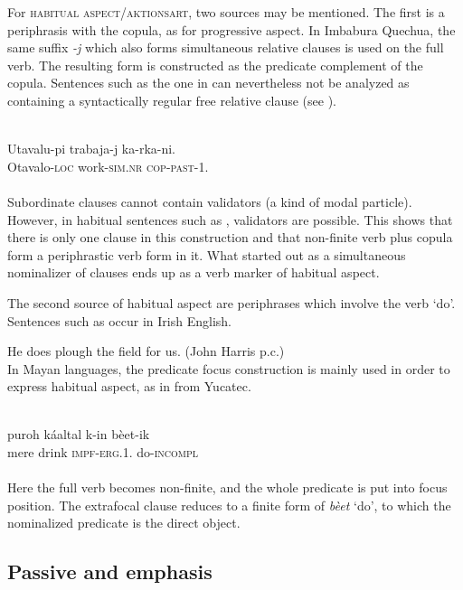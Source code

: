 \label{page33b}For \textsc{habitual aspect/aktionsart}, two sources may be mentioned. The first is a periphrasis with the copula, as for progressive aspect. In Imbabura Quechua, the same suffix \textit{{}-j} which also forms simultaneous relative clauses is used on the full verb. The resulting form is constructed as the predicate complement of the copula. Sentences such as the one in  can nevertheless not be analyzed as containing a syntactically regular free relative clause (see \citealt[149]{Cole1982}).

\ea\label{ex:E4}
\\
\gll Utavalu-pi  trabaja-j  ka-rka-ni.\\
Otavalo-\textsc{loc}  work-\textsc{sim}.\textsc{nr}  \textsc{cop}-\textsc{past}-1.\glsg\\
\\
\z
\noindent Subordinate clauses cannot contain validators (a kind of modal particle). However, in habitual sentences such as , validators are possible. This shows that there is only one clause in this construction and that non-finite verb plus copula form a periphrastic verb form in it. What started out as a simultaneous nominalizer of clauses ends up as a verb marker of habitual aspect.\label{page34}

The second source of habitual aspect are periphrases which involve the verb ‘do’. Sentences such as  occur in Irish English.

\ea\label{ex:E5} He does plough the field for us. \textup{(John Harris p.c.)}\\
\z
\noindent In Mayan languages, the predicate focus construction is mainly used in order to express habitual aspect, as in  from Yucatec.

\ea\label{ex:E6}
\\
\gll puroh  káaltal  k-in  bèet-ik\\
 mere  drink  {\textsc{impf}-\textsc{erg}.1.\glsg}  do-\textsc{incompl}\\
\\
\z
\noindent Here the full verb becomes non-finite, and the whole predicate is put into focus position. The extrafocal clause reduces to a finite form of \textit{bèet} ‘do’, to which the nominalized predicate is the direct object.

\subsection{Passive and emphasis}\label{sec:3.1.5}

